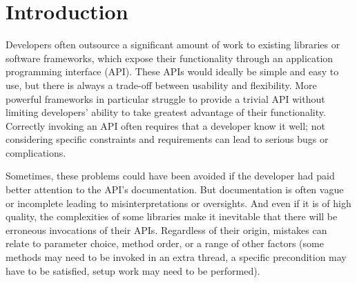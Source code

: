 \chapter{Introduction}\label{ch:intro}

Developers often outsource a significant amount of work to existing libraries or software frameworks, which expose their functionality through an application programming interface (API).
These APIs would ideally be simple and easy to use, but there is always a trade-off between usability and flexibility.
More powerful frameworks in particular struggle to provide a trivial API without limiting developers' ability to take greatest advantage of their functionality.
Correctly invoking an API often requires that a developer know it well;
not considering specific constraints and requirements can lead to serious bugs or complications.

Sometimes, these problems could have been avoided if the developer had paid better attention to the API's documentation.
But documentation is often vague or incomplete leading to misinterpretations or oversights.
And even if it is of high quality, the complexities of some libraries make it inevitable that there will be erroneous invocations of their APIs.
Regardless of their origin, mistakes can relate to parameter choice, method order, or a range of other factors (some methods may need to be invoked in an extra thread, a specific precondition may have to be satisfied, setup work may need to be performed).

